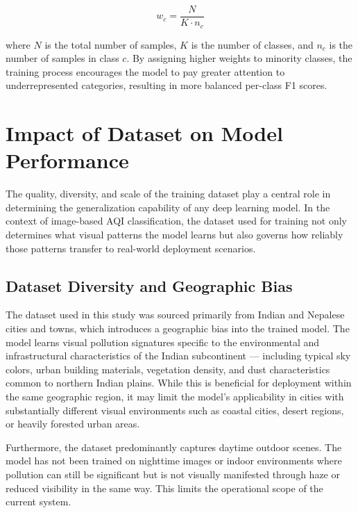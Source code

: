 \documentclass[conference]{IEEEtran}
\begin{document}
\begin{equation}
  w_c = \frac{N}{K \cdot n_c}
\end{equation}

where $N$ is the total number of samples, $K$ is the number of classes, and
$n_c$ is the number of samples in class $c$. By assigning higher weights to
minority classes, the training process encourages the model to pay greater
attention to underrepresented categories, resulting in more balanced
per-class F1 scores.

\section{Impact of Dataset on Model Performance}

The quality, diversity, and scale of the training dataset play a central role
in determining the generalization capability of any deep learning model. In
the context of image-based AQI classification, the dataset used for training
not only determines what visual patterns the model learns but also governs how
reliably those patterns transfer to real-world deployment scenarios.

\subsection{Dataset Diversity and Geographic Bias}

The dataset used in this study was sourced primarily from Indian and Nepalese
cities and towns, which introduces a geographic bias into the trained model.
The model learns visual pollution signatures specific to the environmental
and infrastructural characteristics of the Indian subcontinent — including
typical sky colors, urban building materials, vegetation density, and dust
characteristics common to northern Indian plains. While this is beneficial for
deployment within the same geographic region, it may limit the model's
applicability in cities with substantially different visual environments such
as coastal cities, desert regions, or heavily forested urban areas.

Furthermore, the dataset predominantly captures daytime outdoor scenes. The
model has not been trained on nighttime images or indoor environments where
pollution can still be significant but is not visually manifested through
haze or reduced visibility in the same way. This limits the operational scope
of the current system.
\end{document}
